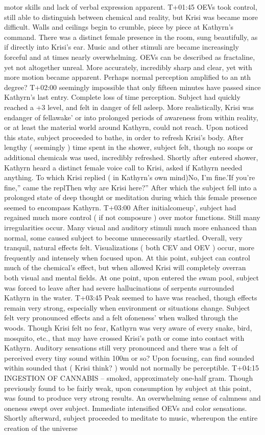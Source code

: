 \documentclass[12pt]{book}
\begin{document}
motor skills and lack of verbal expression apparent. T+01:45 OEVs took control, still able to distinguish between chemical and reality, but Krisi was became more difficult. Walls and ceilings begin to crumble, piece by piece at Kathyrn's command. There was a distinct female presence in the room, sung beautifully, as if directly into Krisi's ear. Music and other stimuli are became increasingly forceful and at times nearly overwhelming. OEVs can be described as fractaline, yet not altogether unreal. More accurately, incredibly sharp and clear, yet with more motion became apparent. Perhaps normal perception amplified to an nth degree? T+02:00 seemingly impossible that only fifteen minutes have passed since Kathyrn's last entry. Complete loss of time perception. Subject had quickly reached a +3 level, and felt in danger of fell asleep. More realistically, Krisi was endanger of fellawake' or into prolonged periods of awareness from within reality, or at least the material world around Kathyrn, could not reach. Upon noticed this state, subject proceeded to bathe, in order to refresh Krisi's body. After lengthy ( seemingly ) time spent in the shower, subject felt, though no soaps or additional chemicals was used, incredibly refreshed. Shortly after entered shower, Kathyrn heard a distinct female voice call to Krisi, asked if Kathyrn needed anything. To which Krisi replied ( in Kathyrn's own mind)No, I'm fine.'If you're fine,'' came the replThen why are Krisi here?'' After which the subject fell into a prolonged state of deep thought or meditation during which this female presence seemed to encompass Kathyrn. T+03:00 After initialcomeup', subject had regained much more control ( if not composure ) over motor functions. Still many irregularities occur. Many visual and auditory stimuli much more enhanced than normal, some caused subject to become unnecessarily startled. Overall, very tranquil, natural effects felt. Visualizations ( both CEV and OEV ) occur, more frequently and intensely when focused upon. At this point, subject can control much of the chemical's effect, but when allowed Krisi will completely overran both visual and mental fields. At one point, upon entered the swam pool, subject was forced to leave after had severe hallucinations of serpents surrounded Kathyrn in the water. T+03:45 Peak seemed to have was reached, though effects remain very strong, especially when environment or situations change. Subject felt very pronounced effects and a felt ofoneness' when walked through the woods. Though Krisi felt no fear, Kathyrn was very aware of every snake, bird, mosquito, etc., that may have crossed Krisi's path or come into contact with Kathyrn. Auditory sensations still very pronounced and there was a felt of perceived every tiny sound within 100m or so? Upon focusing, can find sounded within sounded that ( Krisi think? ) would not normally be perceptible. T+04:15 INGESTION OF CANNABIS -- smoked, approximately one-half gram. Though previously found to be fairly weak, upon consumption by subject at this point, was found to produce very strong results. An overwhelming sense of calmness and oneness swept over subject. Immediate intensified OEVs and color sensations. Shortly afterward, subject proceeded to meditate to music, whereupon the entire creation of the universe 
\end{document}
